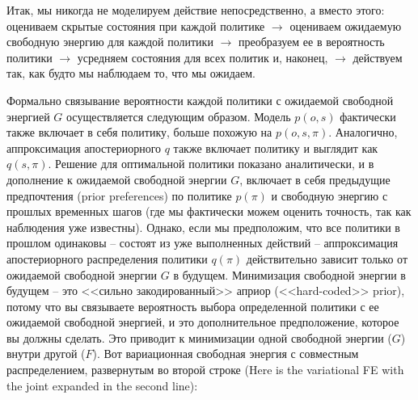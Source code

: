 \documentclass[12pt]{article}
\begin{document}

Итак, мы никогда не моделируем действие непосредственно, а вместо этого: оцениваем скрытые состояния при каждой политике $\rightarrow$ оцениваем ожидаемую свободную энергию для каждой политики $\rightarrow$ преобразуем ее в вероятность политики $\rightarrow$ усредняем состояния для всех политик и, наконец, $\rightarrow$ действуем так, как будто мы наблюдаем то, что мы ожидаем.


Формально связывание вероятности каждой политики с ожидаемой свободной энергией $G$ осуществляется следующим образом. Модель $p(o,s)$ фактически также включает в себя политику, больше похожую на $p(o,s,\pi)$. Аналогично, аппроксимация апостериорного $q$ также включает политику и выглядит как $q(s,\pi)$. Решение для оптимальной политики показано аналитически, и в дополнение к ожидаемой свободной энергии $G$, включает в себя предыдущие предпочтения (prior preferences) по политике $p(\pi)$ и свободную энергию с прошлых временных шагов (где мы фактически можем оценить точность, так как наблюдения уже известны). Однако, если мы предположим, что все политики в прошлом одинаковы -- состоят из уже выполненных действий -- аппроксимация апостериорного распределения политики $q(\pi)$ действительно зависит только от ожидаемой свободной энергии $G$ в будущем. Минимизация свободной энергии в будущем -- это <<сильно закодированный>> априор (<<hard-coded>> prior), потому что вы связываете вероятность выбора определенной политики с ее ожидаемой свободной энергией, и это дополнительное предположение, которое вы должны сделать. Это приводит к минимизации одной свободной энергии ($G$) внутри другой ($F$). Вот вариационная свободная энергия с совместным распределением, развернутым во второй строке (Here is the variational FE with the joint expanded in the second line):
\end{document}
